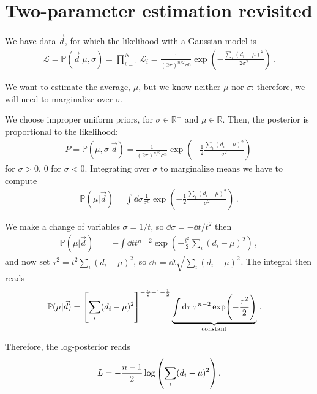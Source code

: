 \documentclass[main.tex]{subfiles}
\begin{document}
\section{Two-parameter estimation revisited}

We have data \(\vec{d}\), for which the likelihood with a Gaussian model is 
%
\begin{align}
\mathscr{L} = \mathbb{P}(\vec{d} | \mu , \sigma ) = \prod_{i=1}^{N} \mathscr{L}_i = \frac{1}{(2\pi )^{n/2}\sigma^{n}} \exp(- \frac{\sum _{i} (d_i - \mu)^2}{2 \sigma^2})
\,.
\end{align}

We want to estimate the average, \(\mu \), but we know neither \(\mu \) nor \(\sigma \): therefore, we will need to marginalize over \(\sigma \).

We choose improper uniform priors, for \(\sigma \in \mathbb{R}^{+}\) and \(\mu \in \mathbb{R}\). 
Then, the posterior is proportional to the likelihood: 
%
\begin{align}
P = \mathbb{P}(\mu , \sigma | \vec{d}) = \frac{1}{(2 \pi )^{n/2} \sigma^{n}} \exp(- \frac{1}{2} \frac{\sum _{i} (d_i - \mu)^2}{\sigma^2})
\,
\end{align}
%
for \(\sigma > 0\), 0 for \(\sigma <0\). Integrating over \(\sigma \) to marginalize means we have to compute 
%
\begin{align}
\mathbb{P}(\mu | \vec{d}) = 
\int \dd{\sigma } \frac{1}{\sigma^{n}} \exp(- \frac{1}{2} \frac{\sum _{i} (d_i - \mu)^2}{\sigma^2})
\,.
\end{align}

We make a change of variables \(\sigma  = 1/t\), so \(\dd{\sigma } = - \dd{t} / t^2 \) then 
%
\begin{align}
\mathbb{P}(\mu | \vec{d})
&= - \int \dd{t} t^{n-2} \exp(- \frac{t^2}{2} \sum _{i}(d_i - \mu)^2)
\,,
\end{align}
%
and now set \(\tau^2 = t^2 \sum _i (d_i - \mu)^2\), so \(\dd{\tau } = \dd{t} \sqrt{\sum_i (d_i - \mu)^2}\). The integral then reads 
%
\begin{align}
\mathbb{P}(\mu | \vec{d}) 
&= \qty[\sum _{i} (d_i - \mu)^2]^{- \frac{n}{2} + 1 - \frac{1}{2}}
\underbrace{\int \dd{\tau } \tau^{n-2} \exp(- \frac{\tau^2}{2})}_{\text{constant}}  
\,.
\end{align}

Therefore, the log-posterior reads 
%
\begin{align}
L = -\frac{n-1}{2} \log \qty(\sum _{i} (d_i - \mu)^2)
\,.
\end{align}
\end{document}
